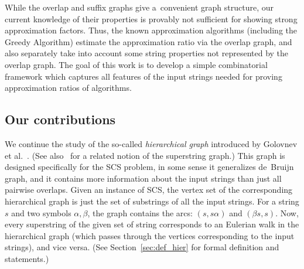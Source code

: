 While the overlap and suffix graphs give a~convenient graph structure, our current knowledge of their properties is provably not sufficient for showing strong approximation factors. Thus, the known approximation algorithms (including the Greedy Algorithm) estimate the approximation ratio via the overlap graph, and also separately take into account some string properties not represented by the overlap graph. The goal of this work is to develop a simple combinatorial framework which captures all features of the input strings needed for proving approximation ratios of algorithms.

\subsection{Our contributions}

We continue the study of the so-called {\em hierarchical graph}
introduced by Golovnev et al.~\cite{scs_exact}. (See also~\cite{cr16} for a related notion of the superstring graph.) This graph is designed specifically 
for the SCS problem, in some sense it generalizes de~Bruijn graph, and it contains more information about the input strings
than just all pairwise overlaps. Given an instance of SCS, the vertex set of the corresponding hierarchical graph is just the set of substrings of all the input strings. For a string $s$ and two symbols $\alpha, \beta$, the graph contains the arcs: $(s,s\alpha)$ and $(\beta s, s)$. Now, every superstring of the given set of string corresponds to an Eulerian walk in the hierarchical graph (which passes through the vertices corresponding to the input strings), and vice versa. (See Section~\ref{sec:def_hier} for formal definition and statements.)

